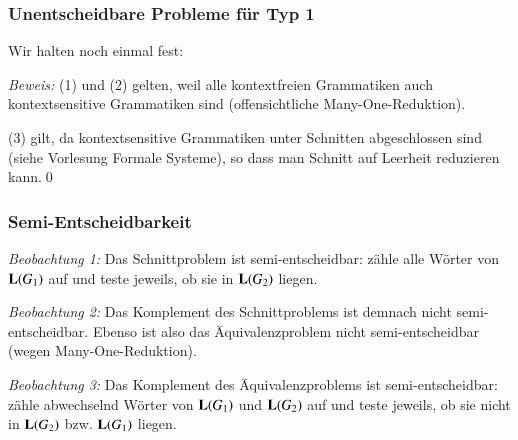 \documentclass[onlymath]{beamer}
\begin{document}
\begin{frame}\frametitle{Unentscheidbare Probleme für Typ 1}

Wir halten noch einmal fest:


\emph{Beweis:} (1) und (2) gelten, weil alle kontextfreien Grammatiken auch
kontextsensitive Grammatiken sind (offensichtliche Many-One-Reduktion).
\bigskip

(3) gilt, da kontextsensitive Grammatiken unter Schnitten abgeschlossen sind (siehe
Vorlesung Formale Systeme), so dass man Schnitt auf Leerheit reduzieren kann.\qed

\end{frame}

\begin{frame}\frametitle{Semi-Entscheidbarkeit}

\emph{Beobachtung 1:} Das Schnittproblem ist semi-entscheidbar: zähle alle
Wörter von $\textbf{\textcolor{black}{L}}(G_1)$ auf und teste jeweils, ob sie in $\textbf{\textcolor{black}{L}}(G_2)$
liegen.
\bigskip\pause

\emph{Beobachtung 2:} Das Komplement des Schnittproblems ist demnach nicht semi-entscheidbar.
Ebenso ist also das Äquivalenzproblem nicht semi-entscheidbar (wegen Many-One-Reduktion).
\bigskip\pause

\emph{Beobachtung 3:} Das Komplement des Äquivalenzproblems ist semi-entscheidbar: zähle abwechselnd Wörter von $\textbf{\textcolor{black}{L}}(G_1)$ und $\textbf{\textcolor{black}{L}}(G_2)$ auf und teste jeweils, ob sie nicht in $\textbf{\textcolor{black}{L}}(G_2)$ bzw. $\textbf{\textcolor{black}{L}}(G_1)$ liegen.

\end{frame}

\end{document}
